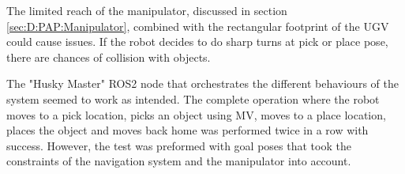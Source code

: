 The limited reach of the manipulator, discussed in section \ref{sec:D:PAP:Manipulator}, combined with the rectangular footprint of the UGV could cause issues. If the robot decides to do sharp turns at pick or place pose, there are chances of collision with objects.

The "Husky Master" ROS2 node that orchestrates the different behaviours of the system seemed to work as intended. The complete operation where the robot moves to a pick location, picks an object using MV, moves to a place location, places the object and moves back home was performed twice in a row with success. However, the test was preformed with goal poses that took the constraints of the navigation system and the manipulator into account.